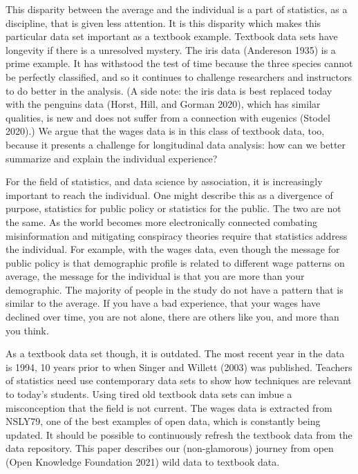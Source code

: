 \documentclass{article}
\begin{document}
This disparity between the average and the individual is a part of statistics, as a discipline, that is given less attention. It is this disparity which makes this particular data set important as a textbook example. Textbook data sets have longevity if there is a unresolved mystery. The iris data (Andereson 1935) is a prime example. It has withstood the test of time because the three species cannot be perfectly classified, and so it continues to challenge researchers and instructors to do better in the analysis. (A side note: the iris data is best replaced today with the penguins data (Horst, Hill, and Gorman 2020), which has similar qualities, is new and does not suffer from a connection with eugenics (Stodel 2020).) We argue that the wages data is in this class of textbook data, too, because it presents a challenge for longitudinal data analysis: how can we better summarize and explain the individual experience?

For the field of statistics, and data science by association, it is increasingly important to reach the individual. One might describe this as a divergence of purpose, statistics for public policy or statistics for the public. The two are not the same. As the world becomes more electronically connected combating misinformation and mitigating conspiracy theories require that statistics address the individual. For example, with the wages data, even though the message for public policy is that demographic profile is related to different wage patterns on average, the message for the individual is that you are more than your demographic. The majority of people in the study do not have a pattern that is similar to the average. If you have a bad experience, that your wages have declined over time, you are not alone, there are others like you, and more than you think.

As a textbook data set though, it is outdated. The most recent year in the data is 1994, 10 years prior to when Singer and Willett (2003) was published. Teachers of statistics need use contemporary data sets to show how techniques are relevant to today's students. Using tired old textbook data sets can imbue a misconception that the field is not current. The wages data is extracted from NSLY79, one of the best examples of open data, which is constantly being updated. It should be possible to continuously refresh the textbook data from the data repository. This paper describes our (non-glamorous) journey from open (Open Knowledge Foundation 2021) wild data to textbook data.
\end{document}
